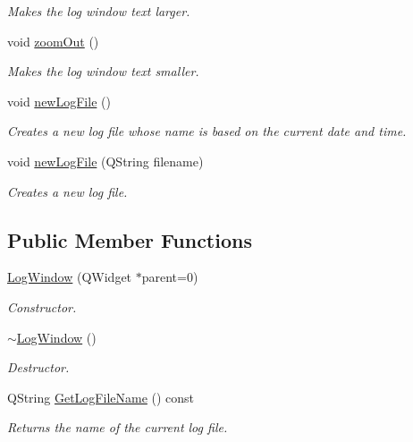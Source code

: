 \begin{DoxyCompactItemize}
\begin{DoxyCompactList}\small\item\em Makes the log window text larger. \end{DoxyCompactList}\item 
\hypertarget{class_log_window_ae534c7a6486b7223427dc2ad65316b09}{void \hyperlink{class_log_window_ae534c7a6486b7223427dc2ad65316b09}{zoom\-Out} ()}\label{class_log_window_ae534c7a6486b7223427dc2ad65316b09}

\begin{DoxyCompactList}\small\item\em Makes the log window text smaller. \end{DoxyCompactList}\item 
\hypertarget{class_log_window_a18658a91b3a65b744a684994ab247dde}{void \hyperlink{class_log_window_a18658a91b3a65b744a684994ab247dde}{new\-Log\-File} ()}\label{class_log_window_a18658a91b3a65b744a684994ab247dde}

\begin{DoxyCompactList}\small\item\em Creates a new log file whose name is based on the current date and time. \end{DoxyCompactList}\item 
void \hyperlink{class_log_window_a903fc2156c1aa3f72c28fff20ecee6e3}{new\-Log\-File} (Q\-String filename)
\begin{DoxyCompactList}\small\item\em Creates a new log file. \end{DoxyCompactList}\end{DoxyCompactItemize}
\subsection*{Public Member Functions}
\begin{DoxyCompactItemize}
\item 
\hyperlink{class_log_window_a3c1a4587d8e7ee120db18abf0184ca22}{Log\-Window} (Q\-Widget $\ast$parent=0)
\begin{DoxyCompactList}\small\item\em Constructor. \end{DoxyCompactList}\item 
\hypertarget{class_log_window_a8c96adb435e3e88f42396876f6213527}{\hyperlink{class_log_window_a8c96adb435e3e88f42396876f6213527}{$\sim$\-Log\-Window} ()}\label{class_log_window_a8c96adb435e3e88f42396876f6213527}

\begin{DoxyCompactList}\small\item\em Destructor. \end{DoxyCompactList}\item 
Q\-String \hyperlink{class_log_window_a7c9598991e02625f315613690b65d33b}{Get\-Log\-File\-Name} () const 
\begin{DoxyCompactList}\small\item\em Returns the name of the current log file. \end{DoxyCompactList}\end{DoxyCompactItemize}


